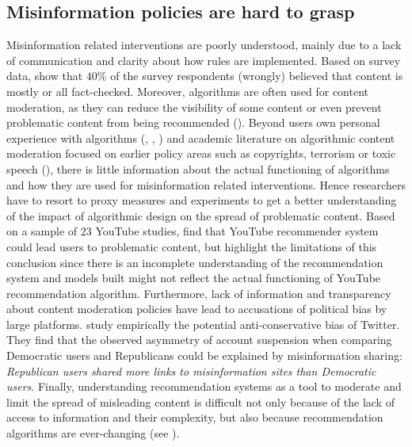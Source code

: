 \documentclass[Afour,sageh,times]{sagej}
\begin{document}
\subsection{Misinformation policies are hard to grasp}
Misinformation related interventions are poorly understood, mainly due to a lack of communication and clarity about how rules are implemented. Based on survey data, \cite{saltzbarrari} show that $40\%$ of the survey respondents (wrongly) believed that content is mostly or all fact-checked. Moreover, algorithms are often used for content moderation, as they can reduce the visibility of some content or even prevent problematic content from being recommended (\cite{gillespie2022not}). Beyond users own personal experience  with algorithms (\cite{cotter2021shadowbanning}, \cite{cotter2019playing}, \cite{bishop2019managing}) and academic literature on algorithmic content moderation focused on earlier policy areas such as copyrights, terrorism or toxic speech (\cite{gorwa2020algorithmic}), there is little information about the actual functioning of algorithms and how they are used for misinformation related interventions. Hence researchers have to resort to proxy measures and experiments to get a better understanding of the impact of algorithmic design on the spread of problematic content. Based on a sample of $23$ YouTube studies, \cite{yesilada} find that YouTube recommender system could lead users to problematic content, but highlight the limitations of this conclusion since there is an incomplete understanding of the recommendation system and models built might not reflect the actual functioning of YouTube recommendation algorithm. Furthermore, lack of information and transparency about content moderation policies have lead to accusations of political bias by large platforms. \cite{yang2022twitter} study empirically the potential anti-conservative bias of Twitter. They find that the observed asymmetry of account suspension when comparing Democratic users and Republicans could be explained by misinformation sharing: {\it Republican users shared more links to misinformation sites than Democratic users}. Finally, understanding recommendation systems as a tool to moderate and limit the spread of misleading content is difficult not only because of the lack of access to information and their complexity, but also because recommendation algorithms are ever-changing (see \cite{llanso2020artificial}). 


\end{document}
